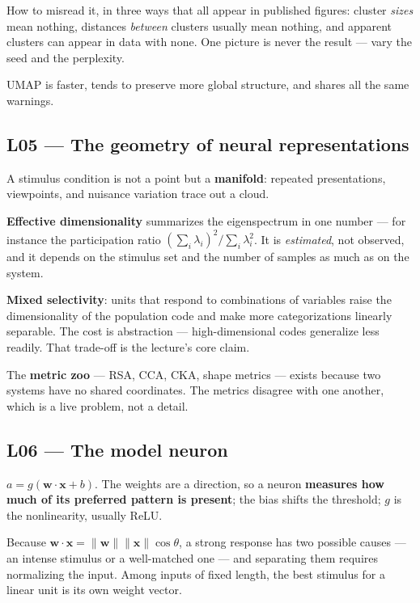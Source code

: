 \documentclass[11pt]{article}
\begin{document}
How to misread it, in three ways that all appear in published figures: cluster
\emph{sizes} mean nothing, distances \emph{between} clusters usually mean
nothing, and apparent clusters can appear in data with none. One picture is
never the result --- vary the seed and the perplexity.

UMAP is faster, tends to preserve more global structure, and shares all the
same warnings.

\subsection{L05 --- The geometry of neural representations}

A stimulus condition is not a point but a \textbf{manifold}: repeated
presentations, viewpoints, and nuisance variation trace out a cloud.

\textbf{Effective dimensionality} summarizes the eigenspectrum in one number ---
for instance the participation ratio $(\sum_i \lambda_i)^2 / \sum_i \lambda_i^2$.
It is \emph{estimated}, not observed, and it depends on the stimulus set and the
number of samples as much as on the system.

\textbf{Mixed selectivity}: units that respond to combinations of variables
raise the dimensionality of the population code and make more categorizations
linearly separable. The cost is abstraction --- high-dimensional codes generalize
less readily. That trade-off is the lecture's core claim.

The \textbf{metric zoo} --- RSA, CCA, CKA, shape metrics --- exists because two
systems have no shared coordinates. The metrics disagree with one another, which
is a live problem, not a detail.

\subsection{L06 --- The model neuron}

$a = g(\boldsymbol{w}\cdot\boldsymbol{x} + b)$. The weights are a direction, so a
neuron \textbf{measures how much of its preferred pattern is present}; the bias
shifts the threshold; $g$ is the nonlinearity, usually ReLU.

Because $\boldsymbol{w}\cdot\boldsymbol{x} =
\|\boldsymbol{w}\|\|\boldsymbol{x}\|\cos\theta$, a strong response has two
possible causes --- an intense stimulus or a well-matched one --- and separating
them requires normalizing the input. Among inputs of fixed length, the best
stimulus for a linear unit is its own weight vector.
\end{document}
